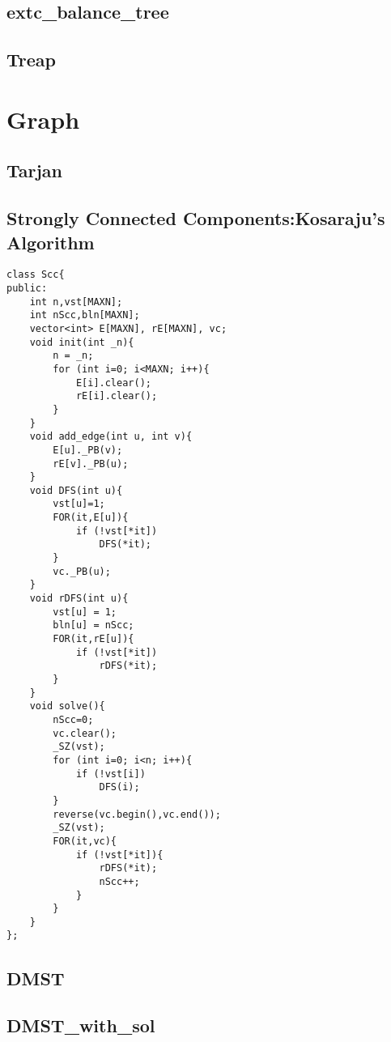 \documentclass[10pt,twocolumn,oneside]{article}
\begin{document}
\subsection{extc_balance_tree}


\subsection{Treap}


\section{Graph}

\subsection{Tarjan}


\subsection{Strongly Connected Components:Kosaraju's Algorithm}
\begin{lstlisting}
class Scc{
public:
	int n,vst[MAXN];
	int nScc,bln[MAXN];
	vector<int> E[MAXN], rE[MAXN], vc;
	void init(int _n){
		n = _n;
		for (int i=0; i<MAXN; i++){
			E[i].clear();
			rE[i].clear();
		}
	}
	void add_edge(int u, int v){
		E[u]._PB(v);
		rE[v]._PB(u);
	}
	void DFS(int u){
		vst[u]=1;
		FOR(it,E[u]){
			if (!vst[*it])
				DFS(*it);
		}
		vc._PB(u);
	}
	void rDFS(int u){
		vst[u] = 1;
		bln[u] = nScc;
		FOR(it,rE[u]){
			if (!vst[*it])
				rDFS(*it);
		}
	}
	void solve(){
		nScc=0;
		vc.clear();
		_SZ(vst);
		for (int i=0; i<n; i++){
			if (!vst[i])
				DFS(i);
		}
		reverse(vc.begin(),vc.end());
		_SZ(vst);
		FOR(it,vc){
			if (!vst[*it]){
				rDFS(*it);
				nScc++;
			}
		}
	}
};
\end{lstlisting}

\subsection{DMST}

\subsection{DMST_with_sol}

\end{document}

